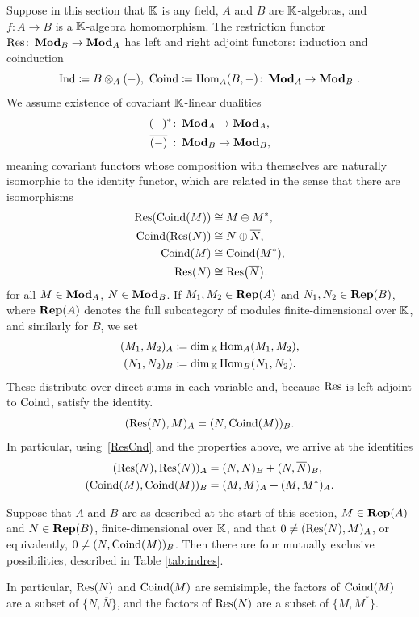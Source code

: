 Suppose in this section that ${\mathbb K}$ is any field, $A$ and $B$ are ${\mathbb K}$-algebras, and $f \colon A \rightarrow B$ is a ${\mathbb K}$-algebra homomorphism. The restriction functor $\Res \colon \Mod_B \rightarrow \Mod_A$
has left and right adjoint functors: induction and coinduction 
\[
\operatorname{Ind} \coloneqq B\otimes_{A}(-), \ \operatorname{Coind} \coloneqq \operatorname{Hom}_A(B,-) \colon \operatorname{\mathbf{Mod}}_A \rightarrow \operatorname{\mathbf{Mod}}_B \, .
\]
We assume existence of covariant ${\mathbb K}$-linear dualities
\begin{align*}
    (-)^* &\colon \operatorname{\mathbf{Mod}}_A \rightarrow \operatorname{\mathbf{Mod}}_A, \\
    \overline{(-)} \hspace{0.4em} &\colon \operatorname{\mathbf{Mod}}_B \rightarrow \operatorname{\mathbf{Mod}}_B ,
\end{align*}
meaning covariant functors whose composition with themselves are naturally isomorphic to the identity functor, which are related in the sense that there are isomorphisms
\begin{align*}
    \Res(\Cnd(M)) &\cong M \oplus M^*, \\
    \Cnd(\Res(N)) &\cong N \oplus \overline{N}, \\
    \Cnd(M) &\cong \Cnd(M^*), \\
    \Res(N) &\cong \Res(\overline{N}).
\end{align*}
for all $M \in \operatorname{\mathbf{Mod}}_A$, $N \in \operatorname{\mathbf{Mod}}_B$.
If  $M_1, M_2 \in \operatorname{\mathbf{Rep}} (A)$ and $N_1, N_2 \in \operatorname{\mathbf{Rep}} (B)$, where $\operatorname{\mathbf{Rep}} (A)$ denotes the full subcategory of modules finite-dimensional over ${\mathbb K}$, and similarly for $B$, we set
\begin{align*}
    (M_1, M_2)_A &\coloneqq \dim_{\, {\mathbb K}} \operatorname{Hom}_A(M_1, M_2), \\
    (N_1, N_2)_B &\coloneqq \dim_{\, {\mathbb K}} \operatorname{Hom}_B(N_1, N_2).
\end{align*}
These distribute over direct sums in each variable and, because $\Res$ is left adjoint to $\operatorname{Coind}$, satisfy the identity.
\begin{equation} \label{ResCnd}
    (\Res(N), M)_A = (N, \Cnd(M))_B.
\end{equation}
In particular, using~\eqref{ResCnd} and the properties above, we arrive at the  identities
\begin{align}
    (\Res(N), \Res(N))_A &= (N,N)_B + (N, \overline{N})_B, \label{eqn:innerprod1} \\
    (\Cnd(M), \Cnd(M))_B &= (M,M)_A + (M, M^*)_A. \label{eqn:innerprod2}
\end{align}

\begin{prop}\label{prop:algindressummary}
Suppose that $A$ and $B$ are as described at the start of this section, $M \in \operatorname{\mathbf{Rep}}(A)$ and $N \in \operatorname{\mathbf{Rep}}(B)$, finite-dimensional over ${\mathbb K}$, and that $0 \neq (\Res(N),M)_A$, or equivalently, $0 \neq (N, \operatorname{Coind}(M))_B$. Then there are four mutually exclusive possibilities, described in Table \ref{tab:indres}.

In particular, $\Res(N)$ and $\operatorname{Coind}(M)$ are semisimple, the factors of $\operatorname{Coind}(M)$ are a subset of $\{N, \overline{N}\}$, and the factors of $\Res(N)$ are a subset of $\{M, M^*\}$.
\end{prop}

